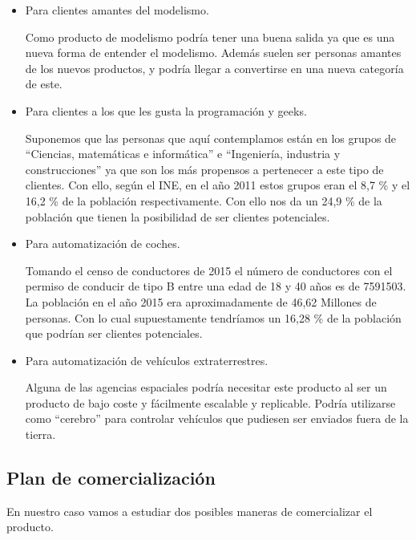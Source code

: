 \documentclass{pclass}
\begin{document}
	\begin{itemize}
		\item Para clientes amantes del modelismo.
		
			Como producto de modelismo podría tener una buena salida ya que es una nueva forma de entender el modelismo. Además suelen ser personas amantes de los nuevos productos, y podría llegar a convertirse en una nueva categoría de este.
			
			
		\item Para clientes a los que les gusta la programación y geeks.
			
			Suponemos que las personas que aquí contemplamos están en los grupos de ``Ciencias, matemáticas e informática'' e ``Ingeniería, industria y construcciones'' ya que son los más propensos a pertenecer a este tipo de clientes. Con ello, según el INE, en el año 2011 estos grupos eran el 8,7 \% y el 16,2 \% de la población respectivamente. Con ello nos da un 24,9 \% de la población que tienen la posibilidad de ser clientes potenciales. \cite{censoINE}
		
		\item Para automatización de coches.
		
			Tomando el censo de conductores de 2015 el número de conductores con el permiso de conducir de tipo B entre una edad de 18 y 40 años es de 7591503. La población en el año 2015 era aproximadamente de 46,62 Millones de personas. Con lo cual supuestamente tendríamos un 16,28 \% de la población que podrían ser clientes potenciales. \cite{censoDGT}
			
		
		\item Para automatización de vehículos extraterrestres.
		
			Alguna de las agencias espaciales podría necesitar este producto al ser un producto de bajo coste y fácilmente escalable y replicable. Podría utilizarse como ``cerebro'' para controlar vehículos que pudiesen ser enviados fuera de la tierra.
			
		
	\end{itemize}

\subsection{Plan de comercialización}

	En nuestro caso vamos a estudiar dos posibles maneras de comercializar el producto.
\end{document}
